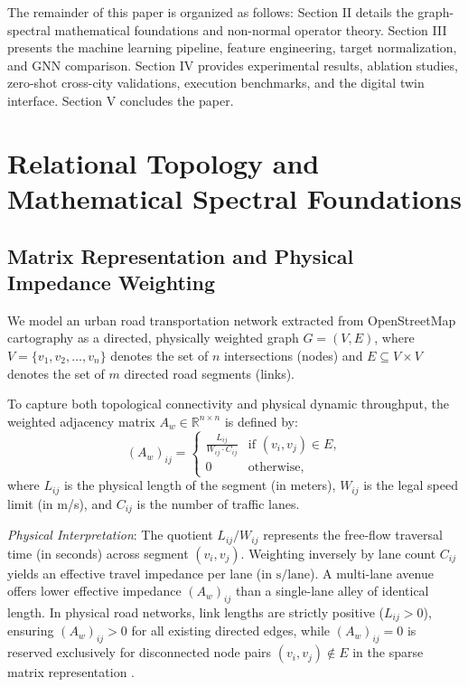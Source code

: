 \documentclass[journal]{IEEEtran}
\begin{document}
The remainder of this paper is organized as follows: Section II details the graph-spectral mathematical foundations and non-normal operator theory. Section III presents the machine learning pipeline, feature engineering, target normalization, and GNN comparison. Section IV provides experimental results, ablation studies, zero-shot cross-city validations, execution benchmarks, and the digital twin interface. Section V concludes the paper.

\section{Relational Topology and Mathematical Spectral Foundations}

\subsection{Matrix Representation and Physical Impedance Weighting}
We model an urban road transportation network extracted from OpenStreetMap cartography \cite{Boeing2017} as a directed, physically weighted graph $G = (V, E)$, where $V = \{v_1, v_2, \dots, v_n\}$ denotes the set of $n$ intersections (nodes) and $E \subseteq V \times V$ denotes the set of $m$ directed road segments (links).

To capture both topological connectivity and physical dynamic throughput, the weighted adjacency matrix $A_w \in \mathbb{R}^{n \times n}$ is defined by:
\begin{equation}
(A_w)_{ij} = \begin{cases} 
\frac{L_{ij}}{W_{ij} \cdot C_{ij}} & \text{if } (v_i, v_j) \in E, \\ 
0 & \text{otherwise,} 
\end{cases}
\label{eq:adjacency}
\end{equation}
where $L_{ij}$ is the physical length of the segment (in meters), $W_{ij}$ is the legal speed limit (in m/s), and $C_{ij}$ is the number of traffic lanes. 

\textit{Physical Interpretation}: The quotient $L_{ij} / W_{ij}$ represents the free-flow traversal time (in seconds) across segment $(v_i, v_j)$. Weighting inversely by lane count $C_{ij}$ yields an effective travel impedance per lane (in $\text{s}/\text{lane}$). A multi-lane avenue offers lower effective impedance $(A_w)_{ij}$ than a single-lane alley of identical length. In physical road networks, link lengths are strictly positive ($L_{ij} > 0$), ensuring $(A_w)_{ij} > 0$ for all existing directed edges, while $(A_w)_{ij} = 0$ is reserved exclusively for disconnected node pairs $(v_i, v_j) \notin E$ in the sparse matrix representation \cite{Sheffi1985, Newman2010}.
\end{document}
